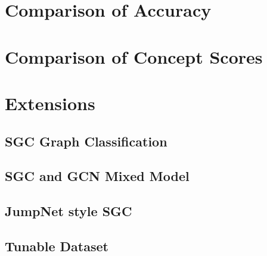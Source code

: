 

\section{Comparison of Accuracy}

\section{Comparison of Concept Scores}

\section{Extensions}

\subsection{SGC Graph Classification}

\subsection{SGC and GCN Mixed Model}

\subsection{JumpNet style SGC}

\subsection{Tunable Dataset}
